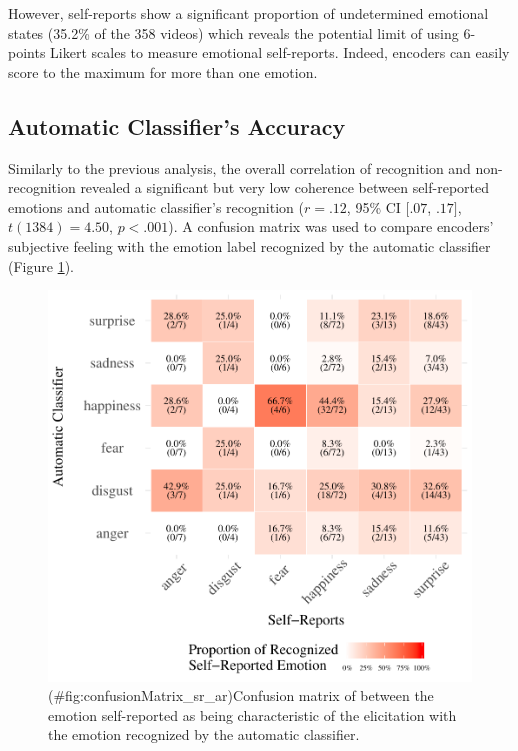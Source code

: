 \documentclass[man]{apa6}
\begin{document}
However, self-reports show a significant proportion of undetermined emotional states (35.2\% of the 358 videos) which reveals the potential limit of using 6-points Likert scales to measure emotional self-reports. Indeed, encoders can easily score to the maximum for more than one emotion.

\hypertarget{automatic-classifiers-accuracy}{%
\subsection{Automatic Classifier's Accuracy}\label{automatic-classifiers-accuracy}}

Similarly to the previous analysis, the overall correlation of recognition and non-recognition revealed a significant but very low coherence between self-reported emotions and automatic classifier's recognition (\(r = .12\), 95\% CI \([.07\), \(.17]\), \(t(1384) = 4.50\), \(p < .001\)). A confusion matrix was used to compare encoders' subjective feeling with the emotion label recognized by the automatic classifier (Figure \ref{fig:confusionMatrix_sr_ar}).

\begin{figure}
\centering
\includegraphics{manuscript_apa_files/figure-latex/confusionMatrix_sr_ar-1.pdf}
\caption{(\#fig:confusionMatrix\_sr\_ar)\label{fig:confusionMatrix_sr_ar}Confusion matrix of between the emotion self-reported as being characteristic of the elicitation with the emotion recognized by the automatic classifier.}
\end{figure}
\end{document}
